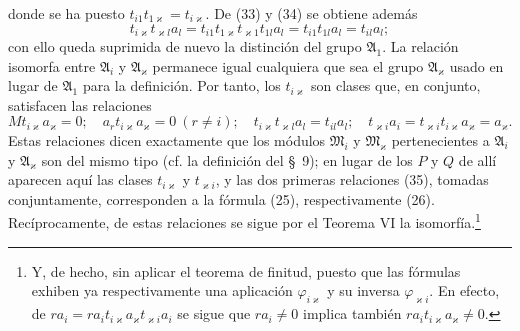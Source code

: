 \documentclass[11pt]{article}
\begin{document}
donde se ha puesto $t_{i1}t_{1\varkappa}=t_{i\varkappa}$. De (33) y (34) se obtiene además
\[
 t_{i\varkappa}t_{\varkappa l}a_l=t_{i1}t_{1\varkappa}t_{\varkappa1}t_{1l}a_l
 =t_{i1}t_{1l}a_l=t_{il}a_l;
\]
con ello queda suprimida de nuevo la distinción del grupo $\mathfrak A_1$. La relación isomorfa entre $\mathfrak A_i$ y $\mathfrak A_\varkappa$ permanece igual cualquiera que sea el grupo $\mathfrak A_\varkappa$ usado en lugar de $\mathfrak A_1$ para la definición. Por tanto, los $t_{i\varkappa}$ son clases que, en conjunto, satisfacen las relaciones
\begin{equation}
 Mt_{i\varkappa}a_\varkappa=0;
 \quad a_rt_{i\varkappa}a_\varkappa=0\ (r\ne i);
 \quad t_{i\varkappa}t_{\varkappa l}a_l=t_{il}a_l;
 \quad t_{\varkappa i}a_i=t_{\varkappa i}t_{i\varkappa}a_\varkappa=a_\varkappa.
\tag{35}
\end{equation}
Estas relaciones dicen exactamente que los módulos $\mathfrak M_i$ y $\mathfrak M_\varkappa$ pertenecientes a $\mathfrak A_i$ y $\mathfrak A_\varkappa$ son del mismo tipo (cf. la definición del \S~9); en lugar de los $P$ y $Q$ de allí aparecen aquí las clases $t_{i\varkappa}$ y $t_{\varkappa i}$, y las dos primeras relaciones (35), tomadas conjuntamente, corresponden a la fórmula (25), respectivamente (26). Recíprocamente, de estas relaciones se sigue por el Teorema VI la isomorfía.\footnote{Y, de hecho, sin aplicar el teorema de finitud, puesto que las fórmulas exhiben ya respectivamente una aplicación $\varphi_{i\varkappa}$ y su inversa $\varphi_{\varkappa i}$. En efecto, de $ra_i=ra_it_{i\varkappa}a_\varkappa t_{\varkappa i}a_i$ se sigue que $ra_i\ne0$ implica también $ra_it_{i\varkappa}a_\varkappa\ne0$.}
\end{document}
